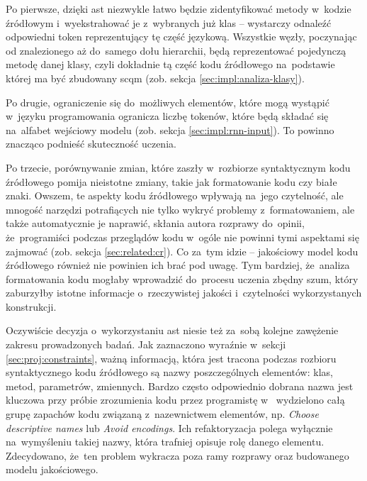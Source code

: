 \documentclass[twoside]{praca}
\begin{document}
Po pierwsze, dzięki \gls{ast} niezwykle łatwo będzie zidentyfikować metody w~kodzie źródłowym i~wyekstrahować je z~wybranych już klas -- wystarczy odnaleźć odpowiedni token reprezentujący tę część językową. Wszystkie węzły, poczynając od znalezionego aż do~samego dołu hierarchii, będą reprezentować pojedynczą metodę danej klasy, czyli dokładnie tą część kodu źródłowego na~podstawie której ma być zbudowany \gls{scqm} (zob. sekcja \ref{sec:impl:analiza-klasy}).

Po drugie, ograniczenie się do~możliwych elementów, które mogą wystąpić w~języku programowania ogranicza liczbę tokenów, które będą składać się na~alfabet wejściowy modelu (zob. sekcja \ref{sec:impl:rnn-input}). To powinno znacząco podnieść skuteczność uczenia.

Po trzecie, porównywanie zmian, które zaszły w~rozbiorze syntaktycznym kodu źródłowego pomija nieistotne zmiany, takie jak formatowanie kodu czy białe znaki. Owszem, te aspekty kodu źródłowego wpływają na~jego czytelność, ale mnogość narzędzi potrafiących nie tylko wykryć problemy z~formatowaniem, ale także automatycznie je naprawić, skłania autora rozprawy do~opinii, że~programiści podczas przeglądów kodu w~ogóle nie powinni tymi aspektami się zajmować (zob. sekcja \ref{sec:related:cr}). Co za~tym idzie -- jakościowy model kodu źródłowego również nie powinien ich brać pod uwagę. Tym bardziej, że~analiza formatowania kodu mogłaby wprowadzić do~procesu uczenia zbędny szum, który zaburzyłby istotne informacje o~rzeczywistej jakości i~czytelności wykorzystanych konstrukcji.

Oczywiście decyzja o~wykorzystaniu \gls{ast} niesie też za~sobą kolejne zawężenie zakresu prowadzonych badań. Jak zaznaczono wyraźnie w~sekcji \ref{sec:proj:constraints}, ważną informacją, która jest tracona podczas rozbioru syntaktycznego kodu źródłowego są nazwy poszczególnych elementów: klas, metod, parametrów, zmiennych. Bardzo często odpowiednio dobrana nazwa jest kluczowa przy próbie zrozumienia kodu przez programistę w~\cite{martin2009clean} wydzielono całą grupę zapachów kodu związaną z~nazewnictwem elementów, np. \textit{Choose descriptive names} lub \textit{Avoid encodings}. Ich refaktoryzacja polega wyłącznie na~wymyśleniu takiej nazwy, która trafniej opisuje rolę danego elementu. 
Zdecydowano, że~ten problem wykracza poza ramy rozprawy oraz budowanego modelu jakościowego.
\end{document}
